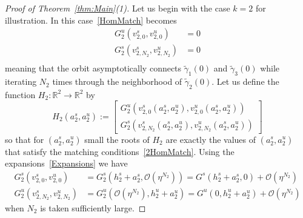 \documentclass[11pt]{article}
\newcommand{\R}{\mathbb{R}}
\numberwithin{equation}{section}
\theoremstyle{plain}
\begin{document}
\begin{proof}[Proof of Theorem~\ref{thm:Main}(1)]
Let us begin with the case $k = 2$ for illustration. In this case~\eqref{HomMatch} becomes
\begin{equation}\label{2HomMatch}
\begin{split}
		G^u_2(v^s_{2,0},v^u_{2,0}) &= 0 \\
		G^s_2(v^s_{2,N_{2}},v^u_{2,N_{2}}) &= 0 \\
	\end{split}
\end{equation}
meaning that the orbit asymptotically connects $\tilde\gamma_1(0)$ and $\tilde\gamma_3(0)$ while iterating $N_2$ times through the neighborhood of $\tilde\gamma_2(0)$. Let us define the function $H_2:\R^2 \to \R^2$ by 
\begin{equation}
	H_2(a^s_2,a^u_2) := \begin{bmatrix}
		G^u_2(v^s_{2,0}(a^s_2,a^u_2),v^u_{2,0}(a^s_2,a^u_2)) \\ G^s_2(v^s_{2,N_2}(a^s_2,a^u_2),v^u_{2,N_2}(a^s_2,a^u_2))	
	\end{bmatrix}
\end{equation} 
so that for $(a^s_2,a^u_2)$ small the roots of $H_2$ are exactly the values of $(a^s_2,a^u_2)$ that satisfy the matching conditions~\eqref{2HomMatch}. Using the expansions~\eqref{Expansions} we have
\begin{equation}\label{2HomExpansion}
		\begin{split}
		G^s_2(v^s_{2,0},v^u_{2,0}) &= G^s_2(h^s_2+a^s_2,\mathcal{O}(\eta^{N_2})) = G^s(h^s_2+a^s_2,0) + \mathcal{O}(\eta^{N_2})  \\
		G^u_2(v^s_{2,N_2},v^u_{2,N_2}) &= G^u_2(\mathcal{O}(\eta^{N_2}),h^u_2+a^u_2) =  G^u(0,h^u_2+a^u_2) + \mathcal{O}(\eta^{N_2})
	\end{split}	
	\end{equation}  
	when $N_2$ is taken sufficiently large. 
	

\end{proof}
\end{document}

